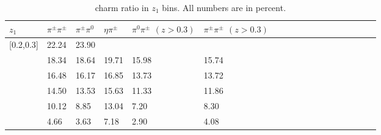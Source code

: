 \begin{table}[H]\footnotesize
\centering
\begin{tabular}{|l|l|l|l|l|l|l|l|l|l|l|l|l|l|l|l|l|l|}
\hline
$z_1$ & $\pi^{\pm}\pi^{\pm}$ & $\pi^{\pm}\pi^0$ & $\eta\pi^{\pm}$ & $\pi^0\pi^{\pm}$ $(z>0.3)$ & $\pi^{\pm}\pi^{\pm}$ $(z>0.3)$ \\ \hline
[0.2,0.3]	&	22.24	&	23.90	&		&		&		\\ \hline
[0.3,0.4]	&	18.34	&	18.64	&	19.71	&	15.98	&	15.74	\\ \hline
[0.4,0.5]	&	16.48	&	16.17	&	16.85	&	13.73	&	13.72	\\ \hline
[0.5,0.6]	&	14.50	&	13.53	&	15.63	&	11.33	&	11.86	\\ \hline
[0.6,0.7]	&	10.12	&	8.85	&	13.04	&	7.20	&	8.30	\\ \hline
[0.7,1.0]	&	4.66	&	3.63	&	7.18	&	2.90	&	4.08	\\ \hline\end{tabular}
\caption{charm ratio in $z_1$ bins. All numbers are in percent.}
\label{tab:sinzcharmratio}
\end{table}

